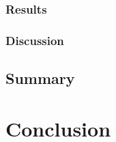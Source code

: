 \documentclass{sig-alternate}
\begin{document}
			\subsubsection{Results}

			\subsubsection{Discussion}

		\subsection{Summary}

	\section{Conclusion}
	\label{s:conclusion}



	{
	
	\small
	
	}

\end{document}
